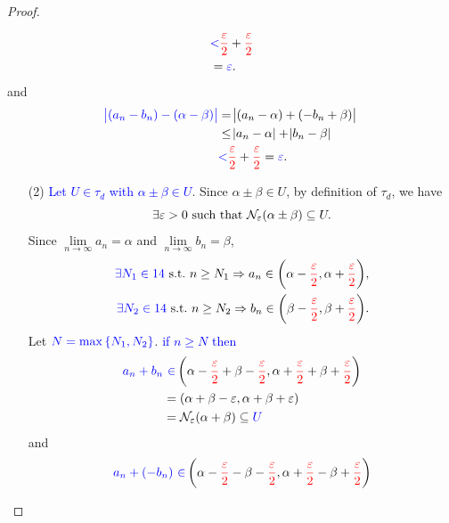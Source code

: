 \documentclass[11pt,openany]{article}
\begin{document}
\begin{note}[]
\begin{proof}
\begin{flushleft}
\begin{minipage}[t]{0.475\textwidth}
\begin{enumerate}
\begin{align*}
		&\textcolor{blue}{<}\textcolor{red}{\frac{\varepsilon}{2}}+\textcolor{red}{\frac{\varepsilon}{2}}\\
		&=\textcolor{blue}{\varepsilon}.
	\end{align*} and \begin{align*}
	\textcolor{blue}{\abs{(a_n- b_n)-(\alpha- \beta)}}&=\abs{(a_n-\alpha)+(-b_n+\beta)}\\
	&\leq\abs{a_n-\alpha}+\abs{b_n-\beta}\\
	&\textcolor{blue}{<}\textcolor{red}{\frac{\varepsilon}{2}}+\textcolor{red}{\frac{\varepsilon}{2}}=\textcolor{blue}{\varepsilon}.
\end{align*}
\end{enumerate}
\end{minipage}%
\hfill\vline
\begin{minipage}[t]{0.485\textwidth}
\begin{enumerate}
	\item[(2)] \textcolor{blue}{Let $U\in\tau_d$ with $\alpha\pm\beta\in U$}. Since $\alpha\pm\beta\in U$, by definition of $\tau_d$, we have \[
	\exists\varepsilon>0\ \text{such that}\ \mathcal{N}_{\varepsilon}(\alpha\pm\beta)\subseteq U.
	\] Since $\lim\limits_{n\to\infty}a_n=\alpha$ and $\lim\limits_{n\to\infty}b_n=\beta$, \begin{align*}
	\textcolor{blue}{\exists N_1\in\N}\ \text{s.t.}\ n\geq N_1\Rightarrow a_n\in {\intoo{\alpha-\textcolor{red}{\frac{\varepsilon}{2}},\alpha+\textcolor{red}{\frac{\varepsilon}{2}}}},\\
	\textcolor{blue}{\exists N_2\in\N}\ \text{s.t.}\ n\geq N_2\Rightarrow b_n\in {\intoo{\beta-\textcolor{red}{\frac{\varepsilon}{2}},\beta+\textcolor{red}{\frac{\varepsilon}{2}}}}.
	\end{align*} Let $\textcolor{blue}{N=\max\set{N_1,N_2}}$. \textcolor{blue}{if $n\geq N$ then} \begin{align*}
		\color{blue}a_n+b_n
		&\ \textcolor{blue}{\in}\intoo{\alpha-\textcolor{red}{\frac{\varepsilon}{2}}+\beta-\textcolor{red}{\frac{\varepsilon}{2}},\alpha+\textcolor{red}{\frac{\varepsilon}{2}}+\beta+\textcolor{red}{\frac{\varepsilon}{2}}}\\
		&=\intoo{\alpha+\beta-\varepsilon,\alpha+\beta+\varepsilon}\\
		&=\nbhd_\varepsilon(\alpha+\beta)\subseteq\textcolor{blue}{U}
	\end{align*}
	and \begin{align*}
		\color{blue} a_n+(-b_n)
		&\ \textcolor{blue}{\in}\intoo{\alpha-\textcolor{red}{\frac{\varepsilon}{2}}-\beta-\textcolor{red}{\frac{\varepsilon}{2}},\alpha+\textcolor{red}{\frac{\varepsilon}{2}}-\beta+\textcolor{red}{\frac{\varepsilon}{2}}}\\

\end{align*}
\end{enumerate}
\end{minipage}
\end{flushleft}
\end{proof}
\end{note}
\end{document}
